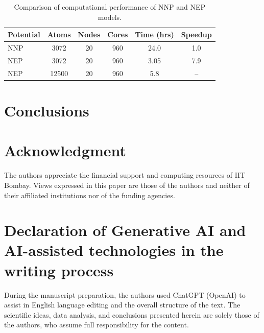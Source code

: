 \documentclass[review, 12pt]{elsarticle}
\numberwithin{equation}{section}
\begin{document}
\begin{table}[h!]
\centering
\caption{Comparison of computational performance of NNP and NEP models.}
\label{tab:performance}
\begin{tabular}{lccccc}
\hline
Potential & Atoms & Nodes & Cores & Time (hrs) & Speedup \\
\hline
NNP & 3072 & 20 & 960 & 24.0 & 1.0 \\
NEP & 3072 & 20 & 960 & 3.05 & 7.9 \\
NEP & 12500 & 20 & 960 & 5.8 & -- \\
\hline
\end{tabular}
\end{table}


\section{Conclusions}



\section*{Acknowledgment}
The authors appreciate the financial support and computing resources of IIT Bombay. Views expressed in this paper are those of the authors and neither of their affiliated institutions nor of the funding agencies.

\section*{Declaration of Generative AI and AI-assisted technologies in the writing process}
During the manuscript preparation, the authors used ChatGPT (OpenAI) to assist in English language editing and the overall structure of the text. The scientific ideas, data analysis, and conclusions presented herein are solely those of the authors, who assume full responsibility for the content.

 

\end{document}
